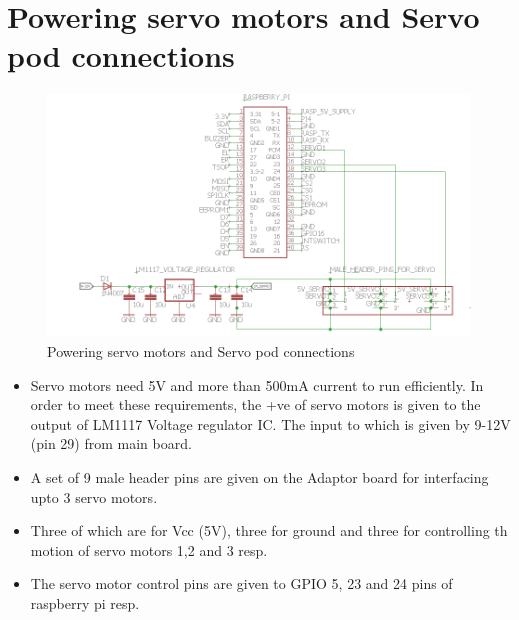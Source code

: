 \documentclass[a4paper,12pt,oneside]{book}
\begin{document}
\section{\textbf{Powering servo motors and Servo pod connections}}
\begin{figure}[h]
	\includegraphics[width=1\textwidth]{servo}
	\caption{Powering servo motors and Servo pod connections}
\end{figure}
\hfill
\begin{itemize}
	\item {Servo motors need 5V and more than 500mA current to run efficiently. In order to meet these requirements, the +ve of servo motors is given to the output of LM1117 Voltage regulator IC. The input to which is given by 9-12V (pin 29) from main board.}
	\item {A set of 9 male header pins are given on the Adaptor board for interfacing upto 3 servo motors.}
	\item {Three of which are for Vcc (5V), three for ground and three for controlling th motion of servo motors 1,2 and 3 resp.}
	\item {The servo motor control pins are given to GPIO 5, 23 and 24 pins of raspberry pi resp. }
\end{itemize}
\pagebreak
\end{document}
